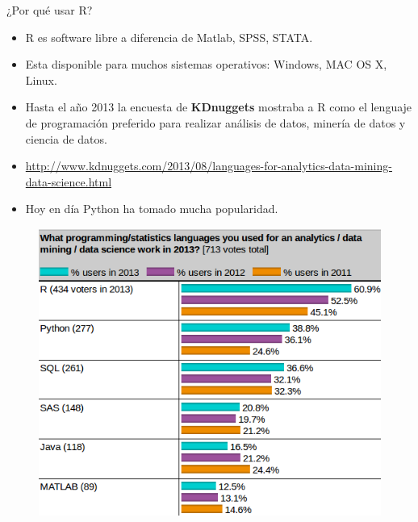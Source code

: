 \documentclass[handout]{beamer}
\begin{document}
\begin{frame}{¿Por qué usar R?}


\scriptsize{
\begin{itemize}
 \item R es software libre a diferencia de Matlab, SPSS, STATA.
 \item Esta disponible para muchos sistemas operativos: Windows, MAC OS X, Linux.
 \item Hasta el año 2013 la encuesta de \textbf{KDnuggets} mostraba a R como el lenguaje de programación preferido para realizar análisis de datos, minería de datos y ciencia de datos.
 \item \url{http://www.kdnuggets.com/2013/08/languages-for-analytics-data-mining-data-science.html}
 \item Hoy en día Python ha tomado mucha popularidad.
\end{itemize}

}

\begin{figure}[h!]
	\centering
	\includegraphics[scale=0.3]{imagenes/rpoll.png}
\end{figure}


\end{frame}
\end{document}
